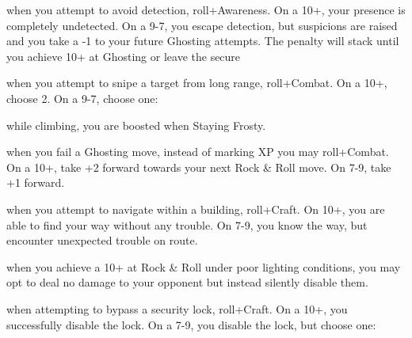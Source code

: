 \begin{dossier}
\hspace{.5cm}%
\vrule width 2pt
\hspace{.3cm}%
\begin{dossiermovebar}
\fontsize{9pt}{1em}\selectfont
\setlength{\parskip}{.2cm}

 when you attempt to avoid detection,
roll+Awareness. On a 10+, your presence is
completely undetected. On a 9-7, you escape
detection, but suspicions are raised and you take
a -1 to your future Ghosting attempts. The penalty
will stack until you achieve 10+ at Ghosting or
leave the secure 

 when you attempt to
snipe a target from long range, roll+Combat. On a
10+, choose 2. On a 9-7, choose one:
\begin{moveoptions}


\end{moveoptions}

 while climbing, you
are boosted when Staying Frosty.

 when you fail a Ghosting move, instead of marking XP you may
roll+Combat. On a 10+, take +2 forward towards
your next Rock \& Roll move. On 7-9, take +1 forward.

 when you
attempt to navigate within a building,
roll+Craft. On 10+, you are able to find your way
without any trouble. On 7-9, you know the way, but
encounter unexpected trouble on route.

 when you achieve a
10+ at Rock \& Roll under poor lighting
conditions, you may opt to deal no damage to your
opponent but instead silently disable them.

 when attempting
to bypass a security lock, roll+Craft. On a 10+,
you successfully disable the lock. On a 7-9, you
disable the lock, but choose one:
\begin{moveoptions}




\end{moveoptions}
\end{dossiermovebar}
\end{dossier}
